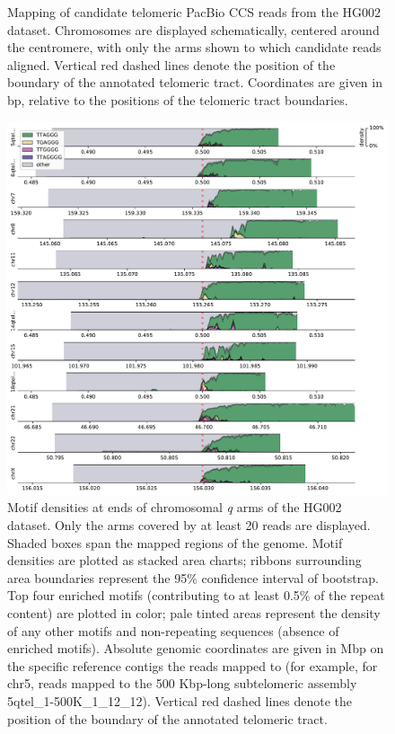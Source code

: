 \documentclass{article}
\begin{document}
\begin{figure}[h!]
\caption{
    Mapping of candidate telomeric PacBio CCS reads from the HG002 dataset.
    Chromosomes are displayed schematically, centered around the centromere, with only the arms shown to which candidate reads aligned.
    Vertical red dashed lines denote the position of the boundary of the annotated telomeric tract.
    Coordinates are given in bp, relative to the positions of the telomeric tract boundaries.
}
\label{fig:hg002_alignment}
\end{figure}
\clearpage \pagebreak

\begin{figure}[h!] \centering
\includegraphics[height=\textheight,width=\textwidth,keepaspectratio]{figures/HG002-densityplot-q_arm.pdf}
\caption{
    Motif densities at ends of chromosomal \textit{q} arms of the HG002 dataset.
    Only the arms covered by at least 20 reads are displayed.
    Shaded boxes span the mapped regions of the genome.
    Motif densities are plotted as stacked area charts; ribbons surrounding area boundaries represent the 95\% confidence interval of bootstrap.
    Top four enriched motifs (contributing to at least 0.5\% of the repeat content) are plotted in color; pale tinted areas represent the density of any other motifs and non-repeating sequences (absence of enriched motifs).
    Absolute genomic coordinates are given in Mbp on the specific reference contigs the reads mapped to (for example, for chr5, reads mapped to the 500 Kbp-long subtelomeric assembly \mbox{5qtel\_1-500K\_1\_12\_12}).
    Vertical red dashed lines denote the position of the boundary of the annotated telomeric tract.
}
\label{fig:hg002_densityplot_q_arm}
\end{figure}
\clearpage \pagebreak
\end{document}
